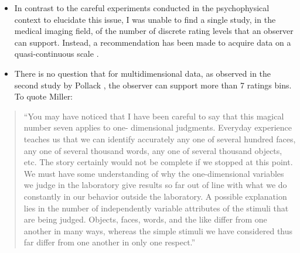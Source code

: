 \documentclass[
]{book}
\begin{document}
\begin{itemize}
\item
  In contrast to the careful experiments conducted in the psychophysical context to elucidate this issue, I was unable to find a single study, in the medical imaging field, of the number of discrete rating levels that an observer can support. Instead, a recommendation has been made to acquire data on a quasi-continuous scale \citep{RN2179}.
\item
  There is no question that for multidimensional data, as observed in the second study by Pollack \citep{RN2474}, the observer can support more than 7 ratings bins. To quote Miller:
\end{itemize}

\begin{quote}
``You may have noticed that I have been careful to say that this magical number seven applies to one- dimensional judgments. Everyday experience teaches us that we can identify accurately any one of several hundred faces, any one of several thousand words, any one of several thousand objects, etc. The story certainly would not be complete if we stopped at this point. We must have some understanding of why the one-dimensional variables we judge in the laboratory give results so far out of line with what we do constantly in our behavior outside the laboratory. A possible explanation lies in the number of independently variable attributes of the stimuli that are being judged. Objects, faces, words, and the like differ from one another in many ways, whereas the simple stimuli we have considered thus far differ from one another in only one respect.''
\end{quote}
\end{document}
